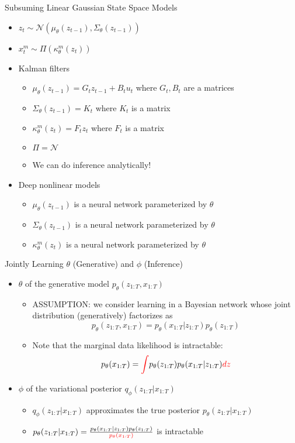 \documentclass{beamer}
\begin{document}
\begin{frame}{Subsuming Linear Gaussian State Space Models}
\begin{itemize}
\item $z_t\sim\mathcal{N}(\mu_\theta(z_{t-1}),\Sigma_\theta(z_{t-1}))$
\item $x_t^m\sim\Pi(\kappa_\theta^m(z_t))$
\item Kalman filters
\begin{itemize}
\item $\mu_\theta(z_{t-1})=G_tz_{t-1}+B_tu_t$ where $G_t, B_t$ are a matrices
\item $\Sigma_\theta(z_{t-1})=K_t$ where $K_t$ is a matrix
\item $\kappa_\theta^m(z_t)=F_tz_t$ where $F_t$ is a matrix
\item $\Pi=\mathcal{N}$
\item We can do inference analytically!
\end{itemize}
\item Deep nonlinear models 
\begin{itemize}
\item $\mu_\theta(z_{t-1})$ is a neural network parameterized by $\theta$
\item $\Sigma_\theta(z_{t-1})$ is a neural network parameterized by $\theta$
\item $\kappa_\theta^m(z_t)$ is a neural network parameterized by $\theta$
\end{itemize}
\end{itemize}
\end{frame}

\begin{frame}{Jointly Learning $\theta$ (Generative) and $\phi$ (Inference)}
\begin{itemize}
\item $\theta$ of the generative model $p_\theta(z_{1:T},x_{1:T})$
\begin{itemize}
\item ASSUMPTION: we consider learning in a Bayesian network whose joint distribution (generatively) factorizes as\[
p_\theta(z_{1:T},x_{1:T})=p_\theta(x_{1:T}|z_{1:T})p_\theta(z_{1:T})
\]
\item Note that the marginal data likelihood is intractable:\[
p_\theta(x_{1:T})=\textcolor{red}{\int} p_\theta(z_{1:T})p_\theta(x_{1:T}|z_{1:T})\textcolor{red}{dz}
\]
\end{itemize}
\item $\phi$ of the variational posterior $q_\phi(z_{1:T}|x_{1:T})$
\begin{itemize}
\item $q_\phi(z_{1:T}|x_{1:T})$ approximates the true posterior $p_\theta(z_{1:T}|x_{1:T})$
\item $p_\theta(z_{1:T}|x_{1:T})=\frac{p_\theta(x_{1:T}|z_{1:T})p_\theta(z_{1:T})}{\textcolor{red}{p_\theta(x_{1:T})}}$ is intractable
\end{itemize}
\end{itemize}
\end{frame}
\end{document}

